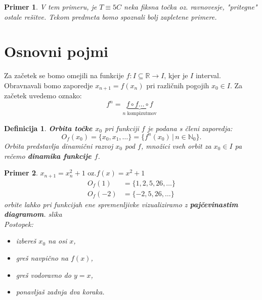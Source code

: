 \documentclass{article}
\newtheorem{definicija}{Definicija}
\newtheorem{primer}{Primer}
\newcommand{\N}{\mathbb{N}}
\newcommand{\R}{\mathbb{R}}
\begin{document}
\begin{primer}

\vspace{1cm}
V tem primeru, je $T \equiv 5C$ neka fiksna točka oz. ravnovesje, "pritegne" ostale rešitve. Tekom predmeta bomo spoznali bolj zapletene primere.
\end{primer}

\maketitle
\section{Osnovni pojmi}
Za začetek se bomo omejili na funkcije $f: I\subseteq \R \rightarrow I$, kjer je $I$ interval. Obravnavali bomo zaporedje $x_{n+1} = f(x_n)$ pri različnih pogojih $x_0 \in I$. Za začetek uvedemo oznako:
$$
f^n = \underbrace{f\circ f \dots \circ f}_{n \text{ kompizutmov} }
$$
\begin{definicija}
\textbf{Orbita točke $x_0$} pri funkciji $f$ je podana s členi zaporedja:
$$
O_f(x_0) = \{x_0, x_1, \dots\} = \{f^n(x_0)\,|\, n\in \N_0\}.
$$
Orbita predstavlja dinamični razvoj $x_0$ pod $f$, množici vseh orbit za $x_0 \in I$ pa rečemo \textbf{dinamika funkcije $f$}.
\end{definicija}

\begin{primer}
$x_{n+1} = x_n^2 + 1 \text{ oz.} f(x) = x^2 + 1$
\begin{align*}
O_f(1) &= \{1, 2, 5, 26, \dots\} \\ 
O_f(-2) &= \{-2, 5, 26, \dots \}
\end{align*}
orbite lahko pri funkcijah ene spremenljivke vizualiziramo z \textbf{pajčevinastim diagramom}.
slika\\ 
Postopek:
\begin{itemize}
\item izbereš $x_0$ na osi $x$,
\item greš navpično na $f(x)$,
\item greš vodoravno do $y = x$,
\item ponavljaš zadnja dva koraka.
\end{itemize}
\end{primer}
\end{document}
